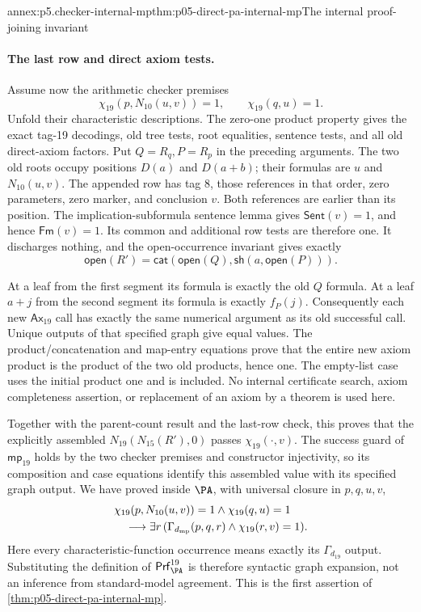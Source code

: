 \begin{annexitem}{annex:p5.checker-internal-mp}{thm:p05-direct-pa-internal-mp}{The internal proof-joining invariant}
\paragraph{The last row and direct axiom tests.}
Assume now the arithmetic checker premises
\[
 \chi_{19}(p,N_{10}(u,v))=1,
                \qquad \chi_{19}(q,u)=1.
\]
Unfold their characteristic descriptions.  The zero-one product property
gives the exact tag-19 decodings, old tree tests, root equalities, sentence
tests, and all old direct-axiom factors.  Put \(Q=R_q,P=R_p\) in the
preceding arguments.  The two old roots occupy positions \(D(a)\) and
\(D(a+b)\); their formulas are \(u\) and \(N_{10}(u,v)\).
The appended row has tag 8, those references in that order, zero parameters,
zero marker, and conclusion \(v\).  Both references are earlier than its
position.  The implication-subformula sentence lemma gives
\(\mathsf{Sent}(v)=1\), and hence \(\mathsf{Fm}(v)=1\).
Its common and additional row tests are therefore one.  It discharges nothing,
and the open-occurrence invariant gives exactly
\[
 \mathsf{open}(R')=
       \mathsf{cat}(\mathsf{open}(Q),
                         \mathsf{sh}(a,\mathsf{open}(P))).
\]

At a leaf from the first segment its formula is exactly the old \(Q\)
formula.  At a leaf \(a+j\) from the second segment its formula is exactly
\(f_P(j)\).  Consequently each new
\(\mathsf{Ax}_{19}\) call has exactly the same numerical argument as its
old successful call.  Unique outputs of that specified graph give equal
values.  The product/concatenation and map-entry equations prove that the
entire new axiom product is the product of the two old products, hence one.
The empty-list case uses the initial product one and is included.  No
internal certificate search, axiom completeness assertion, or replacement
of an axiom by a theorem is used here.

Together with the parent-count result and the last-row check, this proves
that the explicitly assembled \(N_{19}(N_{15}(R'),0)\) passes
\(\chi_{19}(\cdot,v)\).  The success guard of \(\mathsf{mp}_{19}\)
holds by the two checker premises and constructor injectivity, so its
composition and case equations identify this assembled value with its
specified graph output.  We have proved inside \(\PA\), with universal
closure in \(p,q,u,v\),
\[
\begin{split}
 &\chi_{19}(p,N_{10}(u,v))=1\land\chi_{19}(q,u)=1\\
 &\quad\longrightarrow\exists r\,
       (\Gamma_{d_{\rm mp}}(p,q,r)\land\chi_{19}(r,v)=1).
\end{split}
\]
Here every characteristic-function occurrence means exactly its
\(\Gamma_{d_{19}}\) output.  Substituting the definition of
\(\mathsf{Prf}^{19}_{\PA}\) is therefore syntactic graph expansion,
not an inference from standard-model agreement.  This is the first assertion
of \cref{thm:p05-direct-pa-internal-mp}.


\end{annexitem}
